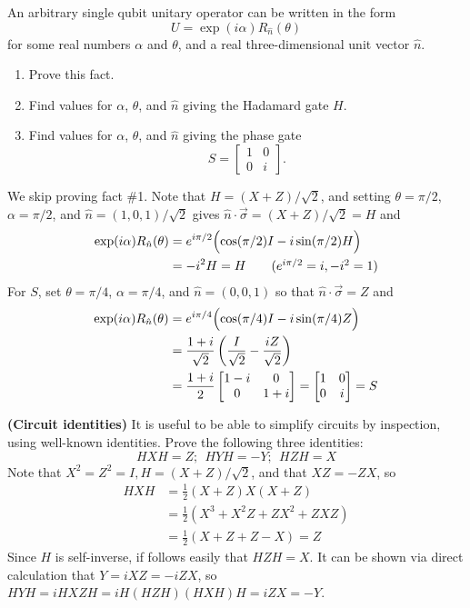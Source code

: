  An arbitrary single qubit unitary operator can be written in the form $$ U=\exp(i\alpha)R_{\hat{n}}(\theta)$$ for some real numbers $\alpha$ and $\theta$, and a real three-dimensional unit vector $\hat{n}$.
\begin{enumerate}
\item Prove this fact.
\item Find values for $\alpha$, $\theta$, and $\hat{n}$ giving the Hadamard gate $H$.
\item Find values for $\alpha$, $\theta$, and $\hat{n}$ giving the phase gate $$S=\begin{bmatrix}1 & 0 \\ 0 & i\end{bmatrix}.$$
\end{enumerate}
\Soln We skip proving fact \#1.  Note that  $H = (X+Z)/\sqrt{2}$, and setting $\theta = \pi/2$, $\alpha=\pi/2$, and $\hat{n} = (1,0,1)/\sqrt{2}$ gives $\hat{n}\cdot\vec{\sigma} = (X+Z)/\sqrt{2} = H$ and
\begin{align*} \exp(i\alpha)R_{\hat{n}}(\theta) & = e^{i\pi/2}\Bigl(\cos(\pi/2)I-i\sin(\pi/2)H\Bigr) \\
&=-i^2H = H \tag{$e^{i\pi/2} = i, -i^2 = 1$}
\end{align*}
For $S$, set $\theta = \pi/4$, $\alpha = \pi/4$, and $\hat{n} = (0,0,1)$ so that $\hat{n}\cdot\vec{\sigma}=Z$ and  
\begin{align*}
\exp(i\alpha)R_{\hat{n}}(\theta) &= e^{i\pi/4}\Bigl(\cos(\pi/4)I -i\sin(\pi/4)Z\Bigr) \\
&= \frac{1+i}{\sqrt{2}}\left(\frac{I}{\sqrt{2}} -\frac{iZ}{\sqrt{2}}\right) \\
& = \frac{1+i}{2}\begin{bmatrix} 1-i & 0 \\ 0 & 1+i\end{bmatrix} = \begin{bmatrix} 1 & 0 \\ 0 & i\end{bmatrix} = S
\end{align*}

\begin{comment} \textbf{(X-Y decomposition of rotations)} Give a decomposition analogous to Theorem 4.1 but using $R_x$ instead of $R_z$.
\end{comment}
 \textbf{(Circuit identities)} It is useful to be able to simplify circuits by inspection, using well-known identities.  Prove the following three identities:$$HXH=Z;\ \ HYH=-Y;\ \ HZH=X$$
\Soln Note that $X^2 =Z^2= I, H = (X+Z)/\sqrt{2}$, and that $XZ=-ZX$, so
\begin{align*} HXH &= \frac{1}{2}(X+Z)X(X+Z) \\
&= \frac{1}{2}(X^3 + X^2Z+ZX^2+ZXZ) \\
&= \frac{1}{2}(X + Z + Z - X) = Z \tag{$X^3=X;\  ZXZ=-Z^2X=-X$}
\end{align*}
Since $H$ is self-inverse, if follows easily that $HZH=X$.  It can be shown via direct calculation that $Y = iXZ = -iZX$, so $HYH=iHXZH=iH(HZH)(HXH)H=iZX=-Y$.

